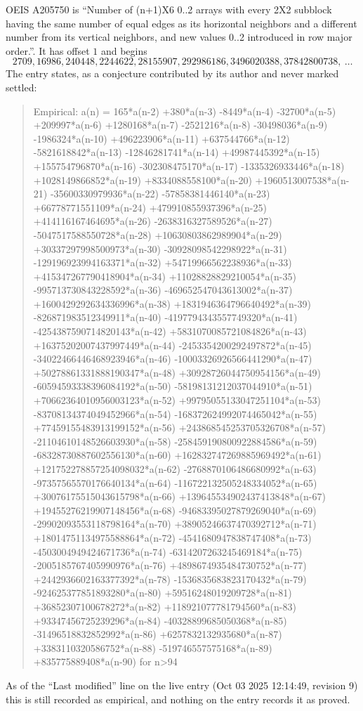 \documentclass[11pt,a4paper]{article}
\theoremstyle{plain}
\theoremstyle{definition}
\begin{document}
OEIS A205750 is ``Number of (n+1)X6 0..2 arrays with every 2X2 subblock having the same number of equal edges as its horizontal neighbors and a different number from its vertical neighbors, and new values 0..2 introduced in row major order.''. It has offset $1$ and begins
\[
2709, 16986, 240448, 2244622, 28155907, 292986186, 3496020388, 37842800738,\ \dots
\]
The entry states, as a conjecture contributed by its author and never marked settled:
\begin{quote}
Empirical: a(n) = 165*a(n-2) +380*a(n-3) -8449*a(n-4) -32700*a(n-5) +209997*a(n-6) +1280168*a(n-7) -2521216*a(n-8) -30498036*a(n-9) -1986324*a(n-10) +496223906*a(n-11) +637544766*a(n-12) -5821618842*a(n-13) -12846281741*a(n-14) +49987445392*a(n-15) +155754796870*a(n-16) -302308475170*a(n-17) -1335326933446*a(n-18) +1028149866852*a(n-19) +8334088558100*a(n-20) +1960513007538*a(n-21) -35600330979936*a(n-22) -57858381446140*a(n-23) +66778771551109*a(n-24) +479910855937396*a(n-25) +414116167464695*a(n-26) -2638316327589526*a(n-27) -5047517588550728*a(n-28) +10630803862989904*a(n-29) +30337297998500973*a(n-30) -30928098542298922*a(n-31) -129196923994163371*a(n-32) +54719966562238936*a(n-33) +415347267790418904*a(n-34) +11028828829210054*a(n-35) -995713730843228592*a(n-36) -469652547043613002*a(n-37) +1600429292634336996*a(n-38) +1831946364796640492*a(n-39) -826871983512349911*a(n-40) -4197794343557749320*a(n-41) -4254387590714820143*a(n-42) +5831070085721084826*a(n-43) +16375202007437997449*a(n-44) -2453354200292497872*a(n-45) -34022466446468923946*a(n-46) -10003326926566441290*a(n-47) +50278861331888190347*a(n-48) +30928726044750954156*a(n-49) -60594593338396084192*a(n-50) -58198131212037044910*a(n-51) +70662364010956003123*a(n-52) +99795055133047251104*a(n-53) -83708134374049452966*a(n-54) -168372624992074465042*a(n-55) +77459155483913199152*a(n-56) +243868545253705326708*a(n-57) -21104610148526603930*a(n-58) -258459190800922884586*a(n-59) -68328730887602556130*a(n-60) +162832747269885969492*a(n-61) +121752278857254098032*a(n-62) -2768870106486680992*a(n-63) -97357565570176640134*a(n-64) -116722132505248334052*a(n-65) +30076175515043615798*a(n-66) +139645534902437413848*a(n-67) +19455276219907148456*a(n-68) -94683395027879269040*a(n-69) -29902093553118798164*a(n-70) +38905246637470392712*a(n-71) +18014751134975588864*a(n-72) -4541680947838747408*a(n-73) -4503004949424671736*a(n-74) -6314207263245469184*a(n-75) -2005185767405990976*a(n-76) +4898674935484730752*a(n-77) +2442936602163377392*a(n-78) -1536835683823170432*a(n-79) -924625377851893280*a(n-80) +59516248019209728*a(n-81) +36852307100678272*a(n-82) +118921077781794560*a(n-83) +93347456725239296*a(n-84) -40328899685050368*a(n-85) -31496518832852992*a(n-86) +6257832132935680*a(n-87) +3383110320586752*a(n-88) -519746557575168*a(n-89) +835775889408*a(n-90) for n>94
\end{quote}
As of the ``Last modified'' line on the live entry (Oct 03 2025 12:14:49, revision 9) this is still
recorded as empirical, and nothing on the entry records it as proved.
\end{document}
